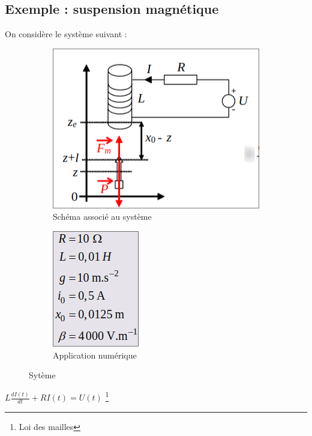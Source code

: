 {{{{\subsection{Exemple : suspension magnétique}
On considère le système suivant :
\begin{figure}[hbt!]
    \centering
    \begin{subfigure}{.5\textwidth}
      \centering
      \includegraphics[width=1\linewidth]{Pics/suspension_magnetique.png}
      \caption{Schéma associé au système}
      \label{fig:sub1}
    \end{subfigure}%
    \begin{subfigure}{.7\textwidth}
      \centering
      \includegraphics[width=.4\linewidth]{Pics/AN_suspension_magnetique.png}
      \caption{Application numérique}
      \label{fig:sub2}
    \end{subfigure}
    \caption{Sytème}
    \label{fig:test}
\end{figure}
\begin{center}
    \Large{$
    L\frac{dI(t)}{dt} + RI(t) = U(t)
    $} \footnote{Loi des mailles}
    \newline


\end{center}}}}}
